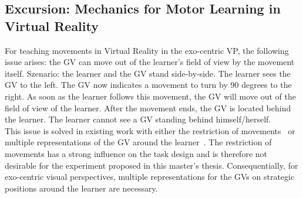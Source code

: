 \subsection{Excursion: Mechanics for Motor Learning in Virtual Reality}
\label{sec:mechanics}
For teaching movements in Virtual Reality in the exo-centric VP, the following issue arises: the GV can move out of the learner's field of view by the movement itself. Szenario: the learner and the GV stand side-by-side. The learner sees the GV to the left. The GV now indicates a movement to turn by 90 degrees to the right. As soon as the learner follows this movement, the GV will move out of the field of view of the learner. After the movement ends, the GV is located behind the learner. The learner cannot see a GV standing behind himself/herself.\\
This issue is solved in existing work with either the restriction of movements~\cite{freethrowsimulator,elearningma} or multiple representations of the GV around the learner~\cite{thaichichua,mythaichicoaches}. The restriction of movements has a strong influence on the task design and is therefore not desirable for the experiment proposed in this master's thesis. Consequentially, for exo-centric visual perspectives, multiple representations for the GVs on strategic positions around the learner are necessary.\\

